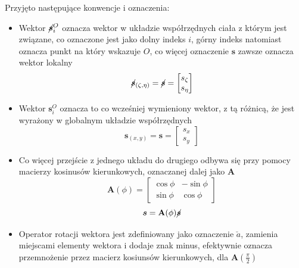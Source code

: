 Przyjęto następujące konwencje i oznaczenia:
\begin{itemize}
    \item Wektor $\cancel{\boldsymbol{s}}_i^O$ oznacza wektor w układzie współrzędnych ciała z którym jest związane, co oznaczone jest jako dolny indeks $i$, górny indeks natomiast oznacza punkt na który wskazuje $O$, co więcej oznaczenie $\boldsymbol{s}$ zawsze oznacza wektor lokalny
    \begin{equation}
        \label{eq:begin_s_cancel}
        \cancel{\boldsymbol{s}}_{(\zeta,\eta)} = \cancel{\boldsymbol{s}} = 
        \begin{bmatrix}
            s_{\zeta}\\
            s_{\eta}
        \end{bmatrix}
    \end{equation}
    \item Wektor ${\boldsymbol{s}}_i^O$ oznacza to co wcześniej wymieniony wektor, z tą różnicą, że jest wyrażony w globalnym układzie współrzędnych
    \begin{equation}
        \label{eq:begin_s}
        {\boldsymbol{s}}_{(x,y)} ={\boldsymbol{s}} = 
        \begin{bmatrix}
            s_{x}\\
            s_{y}
        \end{bmatrix}
    \end{equation}
    \item Co więcej przejście z jednego układu do drugiego odbywa się przy pomocy macierzy kosinusów kierunkowych, oznaczanej dalej jako $\mathbf{A}$
    \begin{equation}
        \label{eq:A_matrix}
            \mathbf{A}(\phi)=
            \begin{bmatrix}
                \cos{\phi}&-\sin{\phi}\\
                \sin{\phi}&\cos{\phi}
            \end{bmatrix}
    \end{equation}
    \begin{equation}
        \label{eq:s_transform}
            {\boldsymbol{s}} = \mathbf{A}(\phi)\cancel{\boldsymbol{s}}
    \end{equation}
    \item Operator rotacji wektora jest zdefiniowany jako oznaczenie $\breve a$, zamienia miejscami elementy wektora i dodaje znak minus, efektywnie oznacza przemnożenie przez macierz kosiunsów kierunkowych, dla $\mathbf{A}(\frac{\pi}{2})$
    \begin{equation}

\end{equation}
\end{itemize}
